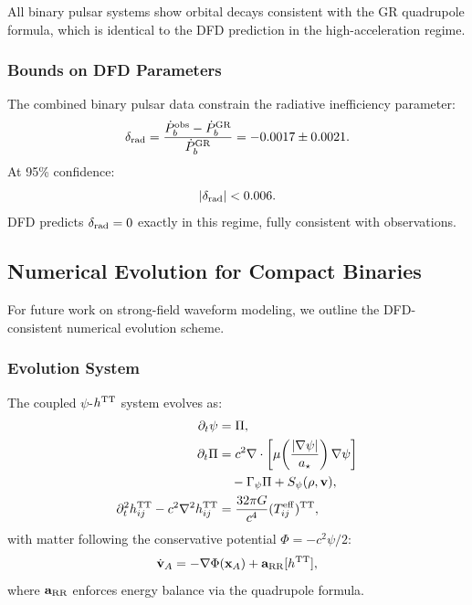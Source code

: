 All binary pulsar systems show orbital decays consistent with the GR quadrupole formula, which is identical to the DFD prediction in the high-acceleration regime.

\subsubsection{Bounds on DFD Parameters}\label{sec:gw-bounds}

The combined binary pulsar data constrain the radiative inefficiency parameter:
\begin{equation}\label{eq:delta-rad-bound}
\delta_{\rm rad} = \frac{\dot{P}_b^{\rm obs} - \dot{P}_b^{\rm GR}}{\dot{P}_b^{\rm GR}} = -0.0017 \pm 0.0021.
\end{equation}
At 95\% confidence:
\begin{equation}
|\delta_{\rm rad}| < 0.006.
\end{equation}
DFD predicts $\delta_{\rm rad} = 0$ exactly in this regime, fully consistent with observations.

\subsection{Numerical Evolution for Compact Binaries}\label{sec:gw-numerical}

For future work on strong-field waveform modeling, we outline the DFD-consistent 
numerical evolution scheme.

\subsubsection{Evolution System}
The coupled $\psi$-$h^{\rm TT}$ system evolves as:
\begin{align}
\partial_t\psi &= \Pi, \\
\partial_t\Pi &= c^2 \nabla\cdot\left[\mu\!\left(\frac{|\nabla\psi|}{a_\star}\right)\nabla\psi\right] \nonumber\\
&\quad - \Gamma_\psi\Pi + S_\psi(\rho, \mathbf{v}), \\
\partial_t^2 h_{ij}^{\rm TT} - c^2\nabla^2 h_{ij}^{\rm TT} &= \frac{32\pi G}{c^4}(T_{ij}^{\rm eff})^{\rm TT},
\end{align}
with matter following the conservative potential $\Phi = -c^2\psi/2$:
\begin{equation}
\dot{\mathbf{v}}_A = -\nabla\Phi(\mathbf{x}_A) + \mathbf{a}_{\rm RR}[h^{\rm TT}],
\end{equation}
where $\mathbf{a}_{\rm RR}$ enforces energy balance via the quadrupole formula.

